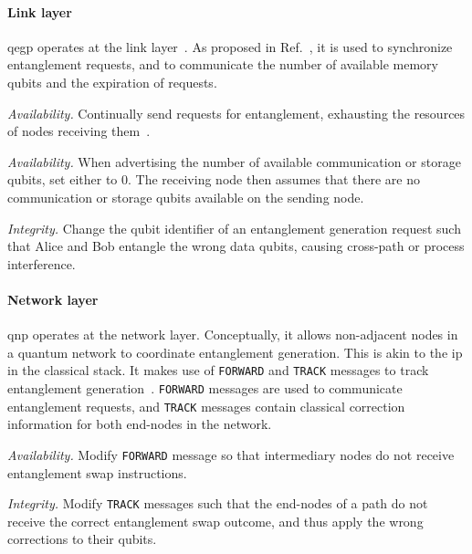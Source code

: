 \paragraph{Link layer}

\acrshort{qegp} operates at the link layer~\cite{dahlberg_2019_egp}. As proposed in
Ref.~\cite{dahlberg_2019_egp}, it is used to synchronize entanglement requests, and to communicate
the number of available memory qubits and the expiration of requests.

\begin{example}
\textit{Availability.}
Continually send requests for entanglement, exhausting the resources of nodes receiving
them~\cite{kozlowski_2019_towards}.
\end{example}

\begin{example}
\textit{Availability.}
When advertising the number of available communication or storage qubits, set either to 0. The
receiving node then assumes that there are no communication or storage qubits available on the
sending node.
\end{example}

\begin{example}
\textit{Integrity.}
Change the qubit identifier of an entanglement generation request such that Alice and Bob entangle
the wrong data qubits, causing cross-path or process interference.
\end{example}

\paragraph{Network layer}

\acrshort{qnp} operates at the network layer. Conceptually, it allows non-adjacent nodes in a
quantum network to coordinate entanglement generation. This is akin to the \acrfull{ip} in the
classical stack. It makes use of \texttt{FORWARD} and \texttt{TRACK} messages to track entanglement
generation~\cite[Figure 6]{kozlowski_2020_qnp}. \texttt{FORWARD} messages are used to communicate
entanglement requests, and \texttt{TRACK} messages contain classical correction information for both
end-nodes in the network.

\begin{example}
\textit{Availability.}
Modify \texttt{FORWARD} message so that intermediary nodes do not receive entanglement swap
instructions.
\end{example}

\begin{example}
\textit{Integrity.}
Modify \texttt{TRACK} messages such that the end-nodes of a path do not receive the correct
entanglement swap outcome, and thus apply the wrong corrections to their qubits.
\end{example}

